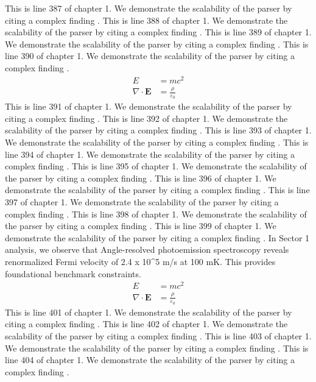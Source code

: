 This is line 387 of chapter 1. We demonstrate the scalability of the parser by citing a complex finding \cite{ref1_387}.
This is line 388 of chapter 1. We demonstrate the scalability of the parser by citing a complex finding \cite{ref1_388}.
This is line 389 of chapter 1. We demonstrate the scalability of the parser by citing a complex finding \cite{ref1_389}.
This is line 390 of chapter 1. We demonstrate the scalability of the parser by citing a complex finding \cite{ref1_390}.
\begin{align*}
  E &= mc^2 \\
  \nabla \cdot \mathbf{E} &= \frac{\rho}{\varepsilon_0}
\end{align*}
This is line 391 of chapter 1. We demonstrate the scalability of the parser by citing a complex finding \cite{ref1_391}.
This is line 392 of chapter 1. We demonstrate the scalability of the parser by citing a complex finding \cite{ref1_392}.
This is line 393 of chapter 1. We demonstrate the scalability of the parser by citing a complex finding \cite{ref1_393}.
This is line 394 of chapter 1. We demonstrate the scalability of the parser by citing a complex finding \cite{ref1_394}.
This is line 395 of chapter 1. We demonstrate the scalability of the parser by citing a complex finding \cite{ref1_395}.
This is line 396 of chapter 1. We demonstrate the scalability of the parser by citing a complex finding \cite{ref1_396}.
This is line 397 of chapter 1. We demonstrate the scalability of the parser by citing a complex finding \cite{ref1_397}.
This is line 398 of chapter 1. We demonstrate the scalability of the parser by citing a complex finding \cite{ref1_398}.
This is line 399 of chapter 1. We demonstrate the scalability of the parser by citing a complex finding \cite{ref1_399}.
In Sector 1 analysis, we observe that Angle-resolved photoemission spectroscopy reveals renormalized Fermi velocity of 2.4 x 10^5 m/s at 100 mK. This provides foundational benchmark constraints.
\begin{align*}
  E &= mc^2 \\
  \nabla \cdot \mathbf{E} &= \frac{\rho}{\varepsilon_0}
\end{align*}
This is line 401 of chapter 1. We demonstrate the scalability of the parser by citing a complex finding \cite{ref1_401}.
This is line 402 of chapter 1. We demonstrate the scalability of the parser by citing a complex finding \cite{ref1_402}.
This is line 403 of chapter 1. We demonstrate the scalability of the parser by citing a complex finding \cite{ref1_403}.
This is line 404 of chapter 1. We demonstrate the scalability of the parser by citing a complex finding \cite{ref1_404}.
